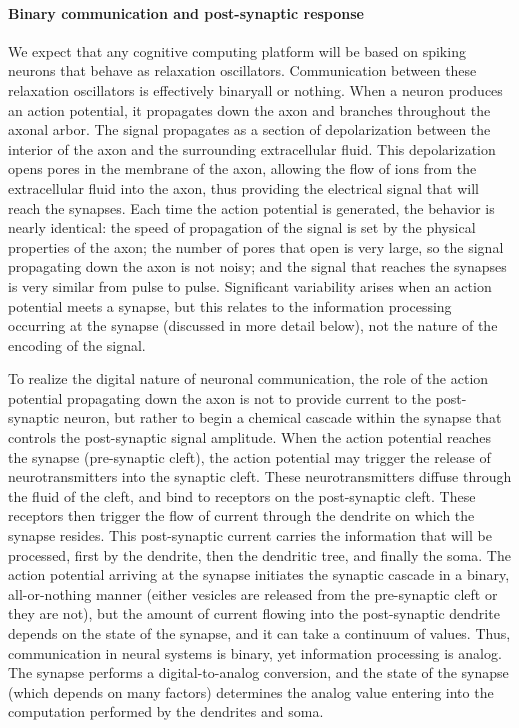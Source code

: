 \documentclass[twocolumn]{article}
\begin{document}
\paragraph{Binary communication and post-synaptic response}
We expect that any cognitive computing platform will be based on spiking neurons that behave as relaxation oscillators. Communication between these relaxation oscillators is effectively binary\textemdash all or nothing. When a neuron produces an action potential, it propagates down the axon and branches throughout the axonal arbor. The signal propagates as a section of depolarization between the interior of the axon and the surrounding extracellular fluid. This depolarization opens pores in the membrane of the axon, allowing the flow of ions from the extracellular fluid into the axon, thus providing the electrical signal that will reach the synapses. Each time the action potential is generated, the behavior is nearly identical: the speed of propagation of the signal is set by the physical properties of the axon; the number of pores that open is very large, so the signal propagating down the axon is not noisy; and the signal that reaches the synapses is very similar from pulse to pulse. Significant variability arises when an action potential meets a synapse, but this relates to the information processing occurring at the synapse (discussed in more detail below), not the nature of the encoding of the signal. 

To realize the digital nature of neuronal communication, the role of the action potential propagating down the axon is not to provide current to the post-synaptic neuron, but rather to begin a chemical cascade within the synapse that controls the post-synaptic signal amplitude. When the action potential reaches the synapse (pre-synaptic cleft), the action potential may trigger the release of neurotransmitters into the synaptic cleft. These neurotransmitters diffuse through the fluid of the cleft, and bind to receptors on the post-synaptic cleft. These receptors then trigger the flow of current through the dendrite on which the synapse resides. This post-synaptic current carries the information that will be processed, first by the dendrite, then the dendritic tree, and finally the soma. The action potential arriving at the synapse initiates the synaptic cascade in a binary, all-or-nothing manner (either vesicles are released from the pre-synaptic cleft or they are not), but the amount of current flowing into the post-synaptic dendrite depends on the state of the synapse, and it can take a continuum of values. Thus, communication in neural systems is binary, yet information processing is analog. The synapse performs a digital-to-analog conversion, and the state of the synapse (which depends on many factors) determines the analog value entering into the computation performed by the dendrites and soma. 
\end{document}
